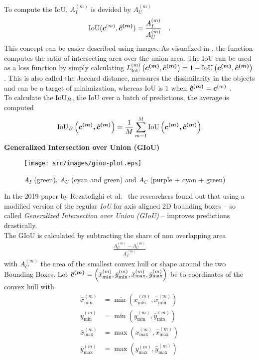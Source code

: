 To compute the IoU, $A^{(m)}_I$ is devided by $A^{(m)}_U$
\begin{align}
    \text{IoU}(\bm{c}^{(m)}, \bm{\hat{c}^{(m)}}) = \frac{A^{(m)}_I}{A^{(m)}_U}\quad .
    \label{eq:iou}
\end{align}
This concept can be easier described using images.
As visualized in , the function computes the ratio of intersecting area over the union area.\newline
The IoU can be used as a loss function by simply calculating $L^{(m)}_{\text{IoU}}\left(\bm{c^{(m)}}, \bm{\hat{c}^{(m)}}\right) = 1 - \text{IoU}\left(\bm{c^{(m)}}, \bm{\hat{c}^{(m)}}\right)$.
This is also called the Jaccard distance, measures the dissimilarity in the objects and can be a target of minimization, whereas IoU is $1$ when $\bm{\hat{c}^{(m)}}=\bm{c}^{(m)}$ .\\
To calculate the $\text{IoU}_B$, the IoU over a batch of predictions, the average is computed
\begin{align}
    \text{IoU}_B\left(
        \bm{c^{(m)},
        \bm{\hat{c}^{(m)}}
    }\right) = \frac{1}{M}
    \sum\limits_{m=1}^M
    \text{IoU}\left(
        \bm{c^{(m)},
        \bm{\hat{c}^{(m)}}
    }\right)
\end{align}
\textbf{Generalized Intersection over Union (GIoU)}\\
\begin{wrapfigure}{r}{0.5\textwidth}
    \centering
    \texttt{[image: src/images/giou-plot.eps]}
    \caption{$A_I$ (green), $A_U$ (cyan and green) and $A_C$ (purple + cyan + green)}
    \label{fig:giou}
\end{wrapfigure}
In the 2019 paper by Rezatofighi et al.~\cite{GIoU} the researchers found out that using a modified version of the regular \textit{IoU} for axis aligned 2D bounding boxes – so called \textit{Generalized Intersection over Union (GIoU)} – improves predictions drastically.\\
The GIoU is calculated by subtracting the share of non overlapping area
\begin{align}
    \frac{A^{(m)}_C - A^{(m)}_U}{A^{(m)}_C}
\end{align}
with $A^{(m)}_C$ the area of the smallest convex hull or shape around the two Bounding Boxes. Let $\bm{\bar{c}^{(m)}} = \left(\bar{x}^{(m)}_{\min}, \bar{y}^{(m)}_{\min}, \bar{x}^{(m)}_{\max}, \bar{y}^{(m)}_{\max}\right)$ be to coordinates of the convex hull
with
\begin{align*}
    \bar{x}^{(m)}_{\min} &= \min(x^{(m)}_{\min}, \hat{x}^{(m)}_{\min})\\
    \bar{y}^{(m)}_{\min} &= \min(y^{(m)}_{\min}, \hat{y}^{(m)}_{\min})\\
    \bar{x}^{(m)}_{\max} &= \max(x^{(m)}_{\max}, \hat{x}^{(m)}_{\max})\\
    \bar{y}^{(m)}_{\max} &= \max(y^{(m)}_{\max}, \hat{y}^{(m)}_{\max})
\end{align*}
